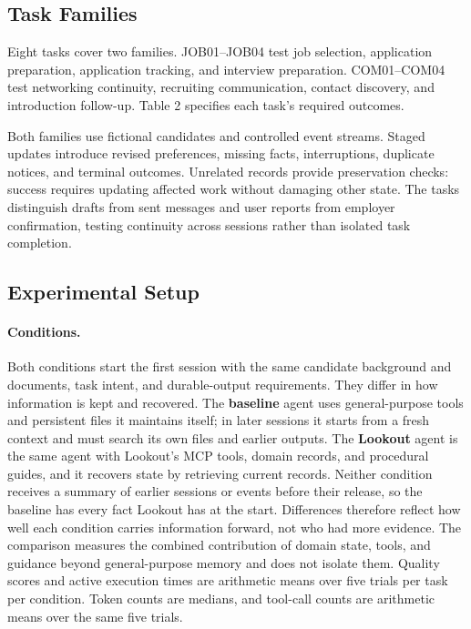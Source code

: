 \documentclass[twocolumn]{article}
\begin{document}
\subsection{Task Families}

Eight tasks cover two families. JOB01--JOB04 test job selection, application preparation, application tracking, and interview preparation. COM01--COM04 test networking continuity, recruiting communication, contact discovery, and introduction follow-up. Table 2 specifies each task's required outcomes.

Both families use fictional candidates and controlled event streams. Staged updates introduce revised preferences, missing facts, interruptions, duplicate notices, and terminal outcomes. Unrelated records provide preservation checks: success requires updating affected work without damaging other state. The tasks distinguish drafts from sent messages and user reports from employer confirmation, testing continuity across sessions rather than isolated task completion.

\subsection{Experimental Setup}\label{sec:setup}
\paragraph{Conditions.}
Both conditions start the first session with the same candidate background and documents, task intent, and durable-output requirements. They differ in how information is kept and recovered. The \textbf{baseline} agent uses general-purpose tools and persistent files it maintains itself; in later sessions it starts from a fresh context and must search its own files and earlier outputs. The \textbf{Lookout} agent is the same agent with Lookout's MCP tools, domain records, and procedural guides, and it recovers state by retrieving current records. Neither condition receives a summary of earlier sessions or events before their release, so the baseline has every fact Lookout has at the start. Differences therefore reflect how well each condition carries information forward, not who had more evidence. The comparison measures the combined contribution of domain state, tools, and guidance beyond general-purpose memory and does not isolate them. Quality scores and active execution times are arithmetic means over five trials per task per condition. Token counts are medians, and tool-call counts are arithmetic means over the same five trials.
\end{document}
